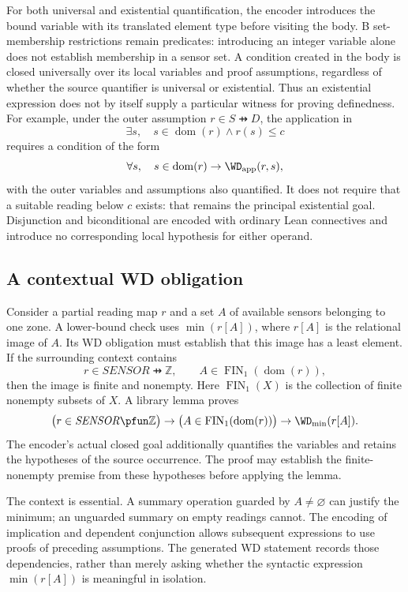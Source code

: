 For both universal and existential quantification, the encoder introduces
the bound variable with its translated element type before visiting the
body. B set-membership restrictions remain predicates: introducing an
integer variable alone does not establish membership in a sensor set.
A condition created in the body is closed universally over its local
variables and proof assumptions, regardless of whether the source
quantifier is universal or existential. Thus an existential expression
does not by itself supply a particular witness for proving definedness.
For example, under the outer assumption $r\in S\pfun D$, the application in
\[
  \exists s,\quad s\in\operatorname{dom}(r)\land r(s)\le c
\]
requires a condition of the form
\[
  \forall s,\quad s\in\operatorname{dom}(r)
  \to\WD_{\mathrm{app}}(r,s),
\]
with the outer variables and assumptions also quantified. It does not
require that a suitable reading below $c$ exists: that remains the
principal existential goal. Disjunction and biconditional are encoded
with ordinary Lean connectives and introduce no corresponding local
hypothesis for either operand.

\subsection{A contextual WD obligation}

Consider a partial reading map $r$ and a set $A$ of available sensors
belonging to one zone. A lower-bound check uses $\min(r[A])$, where
$r[A]$ is the relational image of $A$. Its WD obligation must establish
that this image has a least element. If the surrounding context contains
\[
  r\in\mathit{SENSOR}\pfun\mathbb Z,
  \qquad A\in\operatorname{FIN}_1(\operatorname{dom}(r)),
\]
then the image is finite and nonempty. Here $\operatorname{FIN}_1(X)$ is
the collection of finite nonempty subsets of $X$. A library lemma proves
\[
  \bigl(r\in\mathit{SENSOR}\pfun\mathbb Z\bigr)
  \to\bigl(A\in\operatorname{FIN}_1(\operatorname{dom}(r))\bigr)
  \to\WD_{\min}(r[A]).
\]
The encoder's actual closed goal additionally quantifies the variables
and retains the hypotheses of the source occurrence. The proof may
establish the finite-nonempty premise from these hypotheses before
applying the lemma.

The context is essential. A summary operation guarded by $A\ne\varnothing$
can justify the minimum; an unguarded summary on empty readings cannot.
The encoding of implication and dependent conjunction allows subsequent
expressions to use proofs of preceding assumptions. The generated WD
statement records those dependencies, rather than merely asking whether
the syntactic expression $\min(r[A])$ is meaningful in isolation.

